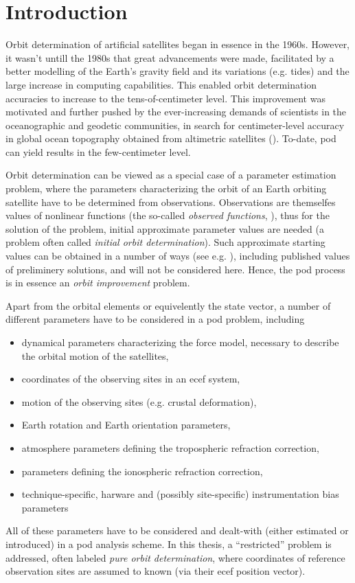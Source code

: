 \section{Introduction}\label{sec:pod-introduction}

Orbit determination of artificial satellites began in essence in the 1960s. However, 
it wasn't untill the 1980s that great advancements were made, facilitated by 
a better modelling of the Earth's gravity field and its variations (e.g. tides) and 
the large increase in computing capabilities. This enabled orbit determination 
accuracies to increase to the tens-of-centimeter level. This improvement was 
motivated and further pushed by the ever-increasing demands of scientists in the 
oceanographic and geodetic communities, in search for centimeter-level accuracy 
in global ocean topography obtained from altimetric satellites (\cite{Tapley2004}).
To-date, \gls{pod} can yield results in the  few-centimeter level.

Orbit determination can be viewed as a special case of a parameter estimation problem, 
where the parameters characterizing the orbit of an Earth orbiting satellite have to be 
determined from observations. Observations are themselfes values of nonlinear functions 
(the so-called \emph{observed functions}, \cite{BeutlerVII}), thus for the solution 
of the problem, initial approximate parameter values are needed (a problem often 
called \emph{initial orbit determination}). Such approximate starting values can be 
obtained in a number of ways (see e.g. \cite{Vallado2001}), including published 
values of preliminery solutions, and will not be considered here. Hence, the \gls{pod} 
process is in essence an \emph{orbit improvement} problem.

Apart from the orbital elements or equivelently the state vector, a number of 
different parameters have to be considered in a \gls{pod} problem, including
\begin{itemize}
    \item dynamical parameters characterizing the force model, necessary to describe 
        the orbital motion of the satellites,
    \item coordinates of the observing sites in an \gls{ecef} system,
    \item motion of the observing sites (e.g. crustal deformation),
    \item Earth rotation and Earth orientation parameters,
    \item atmosphere parameters deﬁning the tropospheric refraction correction,
    \item parameters deﬁning the ionospheric refraction correction,
    \item technique-speciﬁc, harware and (possibly site-specific) instrumentation 
        bias parameters
\end{itemize}
All of these parameters have to be considered and dealt-with (either estimated or 
introduced) in a \gls{pod} analysis scheme. In this thesis, a ``restricted'' problem 
is addressed, often labeled \emph{pure orbit determination}, where coordinates of 
reference observation sites are assumed to known (via their \gls{ecef} position vector).


